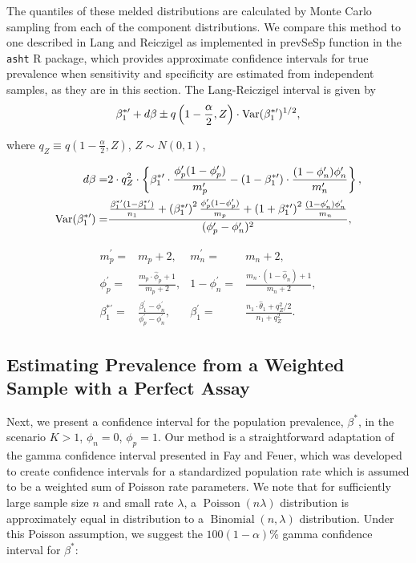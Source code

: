 The quantiles of these melded distributions are calculated by Monte Carlo sampling from each of the component distributions.
We compare this method to one described in Lang and Reiczigel\cite{Lang:2014} as implemented in prevSeSp function in the \texttt{asht} R package,\cite{asht} which provides approximate confidence intervals for true prevalence when sensitivity and specificity are estimated from independent samples, as they are in this section.
The Lang-Reiczigel interval is given by
\begin{equation}
\beta_1^{*\prime} + d\beta \pm q\left( 1 - \frac{\alpha}{2}, Z \right) \cdot \operatorname{Var}(\beta_1^{*\prime})^{1/2},
\end{equation}

where \( q_Z \equiv q\left( 1 - \frac{\alpha}{2}, Z \right)\), \( Z \sim N(0,1) \),

\begin{align*}
    d\beta =& 2 \cdot q_Z^2 \cdot\left\{ \beta_1^{*\prime} \cdot \frac{\phi_p^\prime (1 - \phi_p^\prime)}{m_p^\prime} - (1 - \beta_1^{*\prime}) \cdot \frac{(1 - \phi_n^\prime) \phi_n^\prime}{m_n^\prime} \right\},\\
    \operatorname{Var}(\beta_1^{*\prime}) =& \frac{ \frac{\beta_1^{*\prime}(1 - \beta_1^{*\prime})}{n_1} + \left(\beta_1^{*\prime}\right)^2 \frac{\phi_p^\prime (1 - \phi_p^\prime)}{m_p} + \left(1 + \beta_1^{*\prime}\right)^2 \frac{(1 - \phi_n^\prime) \phi_n^\prime}{ m_n}}{(\phi_p^\prime - \phi_n^\prime)^2},
\end{align*}

\begin{align*}
    m_p^\prime =& m_p +2, &
    m_n^\prime =& m_n + 2, \\
    \phi_p^\prime =& \frac{m_p \cdot \hat{\phi}_p + 1}{m_p + 2}, &
   1 - \phi_n^\prime =& \frac{m_n \cdot (1 - \hat{\phi}_n) + 1}{m_n + 2}, \\
   \beta_1^{*\prime} =& \frac{\beta_1^\prime - \phi_n^\prime}{\phi_p^\prime - \phi_n^\prime}, &
    \beta_1^\prime =& \frac{n_1 \cdot \hat{\theta}_1 + q_Z^2 / 2}{n_1 + q_Z^2}.
\end{align*}

\subsection{Estimating Prevalence from a Weighted Sample with a Perfect Assay}
\label{sec:weight-perfect}

Next, we present a confidence interval for the population prevalence, \( \beta^* \), in the scenario \( K > 1 \), \( \phi_n = 0 \), \( \phi_p = 1 \).
Our method is a straightforward adaptation of the gamma confidence interval presented in Fay and Feuer,\cite{FayF:1997} which was developed to create confidence intervals for a standardized population rate which is assumed to be a weighted sum of Poisson rate parameters.
We note that for sufficiently large sample size \( n \) and small rate \( \lambda \), a \( \operatorname{Poisson}(n\lambda) \) distribution is approximately equal in distribution to a \( \operatorname{Binomial}(n, \lambda) \) distribution.
Under this Poisson assumption, we suggest the \( 100(1 - \alpha) \)\% gamma confidence interval for \( \beta^* \):

